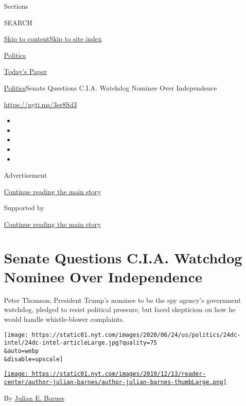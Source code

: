 Sections

SEARCH

\protect\hyperlink{site-content}{Skip to
content}\protect\hyperlink{site-index}{Skip to site index}

\href{https://www.nytimes.com/section/politics}{Politics}

\href{https://myaccount.nytimes.com/auth/login?response_type=cookie\&client_id=vi}{}

\href{https://www.nytimes.com/section/todayspaper}{Today's Paper}

\href{/section/politics}{Politics}\textbar{}Senate Questions C.I.A.
Watchdog Nominee Over Independence

\url{https://nyti.ms/3er8Sd3}

\begin{itemize}
\item
\item
\item
\item
\item
\end{itemize}

Advertisement

\protect\hyperlink{after-top}{Continue reading the main story}

Supported by

\protect\hyperlink{after-sponsor}{Continue reading the main story}

\hypertarget{senate-questions-cia-watchdog-nominee-over-independence}{%
\section{Senate Questions C.I.A. Watchdog Nominee Over
Independence}\label{senate-questions-cia-watchdog-nominee-over-independence}}

Peter Thomson, President Trump's nominee to be the spy agency's
government watchdog, pledged to resist political pressure, but faced
skepticism on how he would handle whistle-blower complaints.

\texttt{[image: https://static01.nyt.com/images/2020/06/24/us/politics/24dc-intel/24dc-intel-articleLarge.jpg?quality=75\\\&auto=webp\\\&disable=upscale]}

\href{https://www.nytimes.com/by/julian-e-barnes}{\texttt{[image: https://static01.nyt.com/images/2019/12/13/reader-center/author-julian-barnes/author-julian-barnes-thumbLarge.png]}}

By \href{https://www.nytimes.com/by/julian-e-barnes}{Julian E. Barnes}

